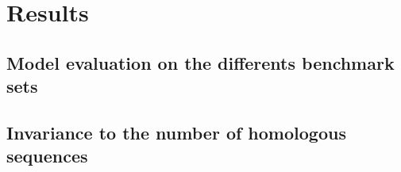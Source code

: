 \chapter{Results}

\section{Model evaluation on the differents benchmark sets}

\section{Invariance to the number of homologous sequences}

